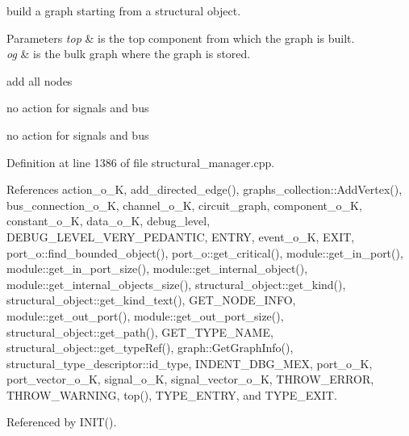 build a graph starting from a structural object. 


\begin{DoxyParams}{Parameters}
{\em top} & is the top component from which the graph is built. \\
\hline
{\em og} & is the bulk graph where the graph is stored. \\
\hline
\end{DoxyParams}
add all nodes

no action for signals and bus

no action for signals and bus 

Definition at line 1386 of file structural\+\_\+manager.\+cpp.



References action\+\_\+o\+\_\+K, add\+\_\+directed\+\_\+edge(), graphs\+\_\+collection\+::\+Add\+Vertex(), bus\+\_\+connection\+\_\+o\+\_\+K, channel\+\_\+o\+\_\+K, circuit\+\_\+graph, component\+\_\+o\+\_\+K, constant\+\_\+o\+\_\+K, data\+\_\+o\+\_\+K, debug\+\_\+level, D\+E\+B\+U\+G\+\_\+\+L\+E\+V\+E\+L\+\_\+\+V\+E\+R\+Y\+\_\+\+P\+E\+D\+A\+N\+T\+IC, E\+N\+T\+RY, event\+\_\+o\+\_\+K, E\+X\+IT, port\+\_\+o\+::find\+\_\+bounded\+\_\+object(), port\+\_\+o\+::get\+\_\+critical(), module\+::get\+\_\+in\+\_\+port(), module\+::get\+\_\+in\+\_\+port\+\_\+size(), module\+::get\+\_\+internal\+\_\+object(), module\+::get\+\_\+internal\+\_\+objects\+\_\+size(), structural\+\_\+object\+::get\+\_\+kind(), structural\+\_\+object\+::get\+\_\+kind\+\_\+text(), G\+E\+T\+\_\+\+N\+O\+D\+E\+\_\+\+I\+N\+FO, module\+::get\+\_\+out\+\_\+port(), module\+::get\+\_\+out\+\_\+port\+\_\+size(), structural\+\_\+object\+::get\+\_\+path(), G\+E\+T\+\_\+\+T\+Y\+P\+E\+\_\+\+N\+A\+ME, structural\+\_\+object\+::get\+\_\+type\+Ref(), graph\+::\+Get\+Graph\+Info(), structural\+\_\+type\+\_\+descriptor\+::id\+\_\+type, I\+N\+D\+E\+N\+T\+\_\+\+D\+B\+G\+\_\+\+M\+EX, port\+\_\+o\+\_\+K, port\+\_\+vector\+\_\+o\+\_\+K, signal\+\_\+o\+\_\+K, signal\+\_\+vector\+\_\+o\+\_\+K, T\+H\+R\+O\+W\+\_\+\+E\+R\+R\+OR, T\+H\+R\+O\+W\+\_\+\+W\+A\+R\+N\+I\+NG, top(), T\+Y\+P\+E\+\_\+\+E\+N\+T\+RY, and T\+Y\+P\+E\+\_\+\+E\+X\+IT.



Referenced by I\+N\+I\+T().

